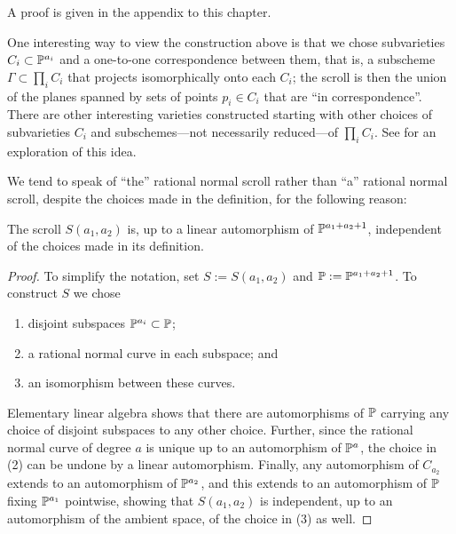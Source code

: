 A proof is given in the appendix to this chapter.

One interesting way to view the construction above is that we chose subvarieties $C_{i}\subset \PP^{a_{i}}$ and a one-to-one correspondence between them, that is, a subscheme
$\Gamma\subset \prod_{i}C_{i}$ that projects isomorphically onto each $C_{i}$; the scroll is then the
union of the planes spanned by sets of points $p_{i}\in C_{i}$ that are ``in correspondence''. There are other interesting varieties constructed starting with other choices of subvarieties $C_{i}$ and subschemes---not necessarily reduced---of $\prod_{i}C_{i}$. See \cite{Eisenbud-Sammartano} for an exploration of this idea.

We tend to speak of ``the'' rational normal scroll rather than ``a'' rational normal scroll, despite the choices made in the definition, for the following reason:

\begin{proposition}\label{uniqueness of scrolls}
The scroll $S(a_1,a_2)$ is, up to a linear automorphism of $\PP^{a_1+a_2+1}$, independent of the choices made in its
 definition. 
\end{proposition}
\begin{proof} 
To simplify the notation, set $S := S(a_{1}, a_{2})$ and $\PP := \PP^{a_1+a_2+1}$.
To construct $S$ we chose 
\begin{enumerate}
 \item disjoint subspaces $\PP^{a_i}\subset \PP$;
 \item a rational normal curve in each subspace; and
 \item an isomorphism between these curves.
\end{enumerate}
Elementary linear algebra shows that there are automorphisms of $\PP$ carrying any choice of disjoint subspaces to any other choice. Further, since the rational normal curve of degree $a$ is unique up to an automorphism of $\PP^{a}$, the choice in (2) can be undone by a linear automorphism. Finally, any automorphism of $C_{a_{2}}$ extends to an automorphism of $\PP^{a_{2}}$, and this extends to an automorphism of $\PP$ fixing $\PP^{a_{1}}$ pointwise,
showing that $S(a_{1}, a_{2})$ is independent, up to an automorphism of the ambient space, of the choice in (3)  as well.
\end{proof}


